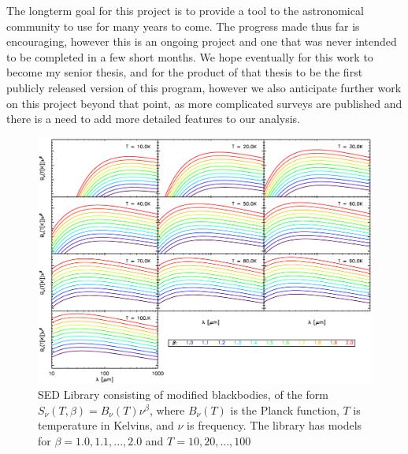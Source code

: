 \documentclass[twocolumn,letterpaper,10pt]{article}
\begin{document}
The longterm goal for this project is to provide a tool to the astronomical community to use for many years to come. The progress made thus far is encouraging, however this is an ongoing project and one that was never intended to be completed in a few short months. We hope eventually for this work to become my senior thesis, and for the product of that thesis to be the first publicly released version of this program, however we also anticipate further work on this project beyond that point, as more complicated surveys are published and there is a need to add more detailed features to our analysis.




\begin{figure}
  \includegraphics[width=\textwidth,trim=0.25in 0.25in 0.25in 0.25in,clip=true]{template.eps}
  \caption{SED Library consisting of modified blackbodies, of the form $S_\nu(T,\beta)=B_\nu(T)\nu^\beta$, where $B_\nu(T)$ is the Planck function, $T$ is temperature in Kelvins, and $\nu$ is frequency.  The library has models for $\beta = 1.0,1.1,...,2.0$ and $T=10,20,...,100$}
  \label{slib}
\end{figure}
\end{document}
